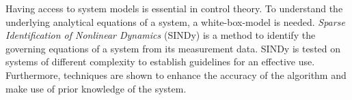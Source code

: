 Having access to system models is essential in control theory. To understand the underlying analytical equations of a system, a white-box-model is needed. \textit{Sparse Identification of Nonlinear Dynamics} (SINDy) is a method to identify the governing equations of a system from its measurement data. SINDy is tested on systems of different complexity to establish guidelines for an effective use. Furthermore, techniques are shown to enhance the accuracy of the algorithm and make use of prior knowledge of the system.











